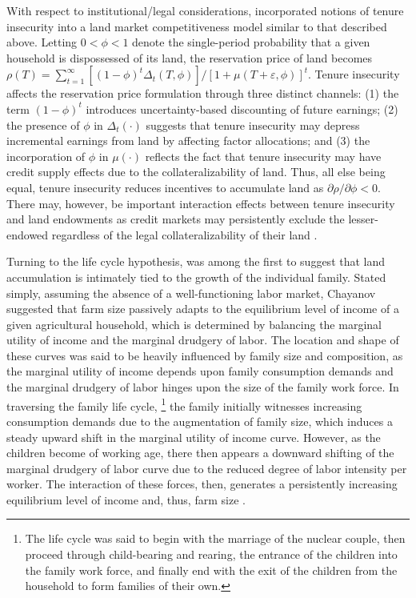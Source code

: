 \documentclass[english]{article}
\begin{document}
With respect to institutional/legal considerations, \citet{carter1998b} 
incorporated notions of tenure insecurity into a land market competitiveness 
model similar to that described above.
Letting $0 < \phi < 1$ denote the single-period probability that a given 
household is dispossessed of its land, the reservation price of land becomes 
$\rho(T) = \sum_{t=1}^{\infty} [(1 - \phi)^t \Delta_t(T, \phi)]/
[1 + \mu(T + \varepsilon, \phi)]^t$.
Tenure insecurity affects the reservation price formulation through three distinct
channels: (1) the term $(1 - \phi)^t$ introduces uncertainty-based discounting 
of future earnings; (2) the presence of $\phi$ in $\Delta_t(\cdot)$ suggests 
that tenure insecurity may depress incremental earnings from land by affecting 
factor allocations; and (3) the incorporation of $\phi$ in $\mu(\cdot)$ reflects 
the fact that tenure insecurity may have credit supply effects due to the 
collateralizability of land.
Thus, all else being equal, tenure insecurity reduces incentives to accumulate
land as $\partial \rho / \partial \phi < 0$.
There may, however, be important interaction effects between tenure insecurity
and land endowments as credit markets may persistently exclude the 
lesser-endowed regardless of the legal collateralizability of their land 
\citep{carter1988}.

Turning to the life cycle hypothesis, \citet{chayanov1966} was among the first 
to suggest that land accumulation is intimately tied to the growth of the 
individual family. 
Stated simply, assuming the absence of a well-functioning labor market, 
Chayanov suggested that farm size passively adapts to the equilibrium level of 
income of a given agricultural household, which is determined by balancing 
the marginal utility of income and the marginal drudgery of labor. 
The location and shape of these curves was said to be heavily influenced by 
family size and composition, as the marginal utility of income depends upon 
family consumption demands and the marginal drudgery of labor hinges upon 
the size of the family work force. 
In traversing the family life cycle,%
\footnote{The life cycle was said to begin with the marriage of the nuclear 
couple, then proceed through child-bearing and rearing, the entrance of the 
children into the family work force, and finally end with the exit of the children 
from the household to form families of their own.} 
the family initially witnesses increasing consumption demands due to the 
augmentation of family size, which induces a steady upward shift in the 
marginal utility of income curve. 
However, as the children become of working age, there then appears a 
downward shifting of the marginal drudgery of labor curve due to the reduced 
degree of labor intensity per worker. 
The interaction of these forces, then, generates a persistently increasing 
equilibrium level of income and, thus, farm size 
\citep{harrison1975, banaji1976}. 
\end{document}
